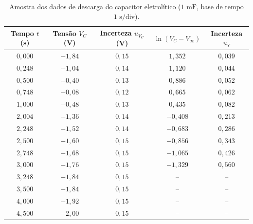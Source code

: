 \documentclass[12pt, a4paper]{article}
\begin{document}
\begin{table}[H]
    \centering
    \caption{Amostra dos dados de descarga do capacitor eletrolítico ($1\text{ mF}$, base de tempo $1\text{ s/div}$).}
    \label{tab:dados_eletrolitico}
    \small
    \begin{tabular}{ccccc}
        \toprule
        \textbf{Tempo $t$ (s)} & \textbf{Tensão $V_C$ (V)} & \textbf{Incerteza $u_{V_C}$ (V)} & \textbf{$\ln(V_C - V_{\infty})$} & \textbf{Incerteza $u_Y$} \\
        \midrule
        $0{,}000$ & $+1{,}84$ & $0{,}15$ & $1{,}352$ & $0{,}039$ \\
        $0{,}248$ & $+1{,}04$ & $0{,}14$ & $1{,}120$ & $0{,}044$ \\
        $0{,}500$ & $+0{,}40$ & $0{,}13$ & $0{,}886$ & $0{,}052$ \\
        $0{,}748$ & $-0{,}08$ & $0{,}12$ & $0{,}665$ & $0{,}062$ \\
        $1{,}000$ & $-0{,}48$ & $0{,}13$ & $0{,}435$ & $0{,}082$ \\
        $2{,}004$ & $-1{,}36$ & $0{,}14$ & $-0{,}408$ & $0{,}213$ \\
        $2{,}248$ & $-1{,}52$ & $0{,}14$ & $-0{,}683$ & $0{,}286$ \\
        $2{,}500$ & $-1{,}60$ & $0{,}15$ & $-0{,}856$ & $0{,}343$ \\
        $2{,}748$ & $-1{,}68$ & $0{,}15$ & $-1{,}065$ & $0{,}426$ \\
        $3{,}000$ & $-1{,}76$ & $0{,}15$ & $-1{,}329$ & $0{,}560$ \\
        $3{,}248$ & $-1{,}84$ & $0{,}15$ & -- & -- \\
        $3{,}500$ & $-1{,}84$ & $0{,}15$ & -- & -- \\
        $4{,}000$ & $-1{,}92$ & $0{,}15$ & -- & -- \\
        $4{,}500$ & $-2{,}00$ & $0{,}15$ & -- & -- \\
        \bottomrule
    \end{tabular}
\end{table}
\end{document}
